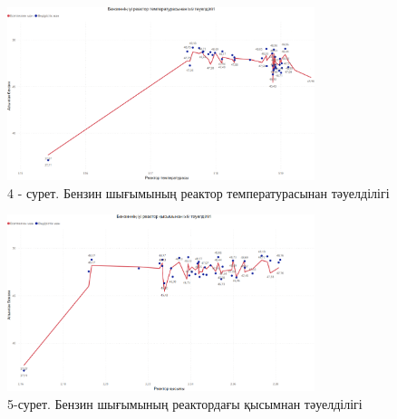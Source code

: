 \begin{figure}[H]
	\centering
	\includegraphics[width=0.8\textwidth]{media/ict/image97}
	\caption*{4 - сурет. Бензин шығымының реактор температурасынан
тәуелділігі}
\end{figure}

\begin{figure}[H]
	\centering
	\includegraphics[width=0.8\textwidth]{media/ict/image98}
	\caption*{5-сурет. Бензин шығымының реактордағы қысымнан тәуелділігі}
\end{figure}

